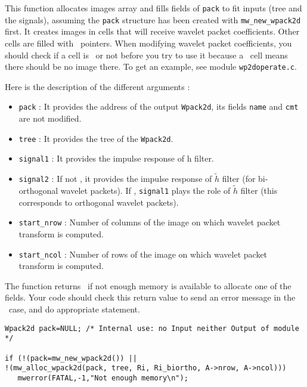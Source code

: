 \Description
This function allocates images array and fills fields of \verb+pack+ to fit inputs 
(tree and the signals), assuming the \verb+pack+ structure has been created with \verb+mw_new_wpack2d+ first. 
It creates images in cells that will receive wavelet packet coefficients. Other cells are filled with \Null\
pointers. When modifying wavelet packet coefficients, you should check if  a
cell is \Null\ or not before you try to use it because a \Null\ cell means there
should be no image there.  To get an example, see module \verb+wp2doperate.c+.


Here is the description of the different arguments :
\begin{itemize}
\item \verb+pack+ : It provides the address of the output
  \verb+Wpack2d+, its fields \verb+name+ and \verb+cmt+ are not modified.
\item \verb+tree+ : It provides the tree of the \verb+Wpack2d+.
\item \verb+signal1+ : It provides the impulse response of h filter.
\item \verb+signal2+ : If not \Null, it provides the impulse response of
  $\tilde{h}$ filter (for bi-orthogonal wavelet packets). If \Null, \verb+signal1+ plays the role of 
  $\tilde{h}$ filter (this corresponds to orthogonal wavelet packets). 
\item \verb+start_nrow+ : Number of columns of the image on which wavelet packet transform is computed.
\item \verb+start_ncol+ : Number of rows of the image on which wavelet packet transform is computed.
\end{itemize}

The function returns \Null\ if not enough memory is available to allocate one of the fields. 
Your code should check this return value to send an error message in the \Null\ case, and do appropriate statement.

\Next
\Example
\begin{verbatim}
Wpack2d pack=NULL; /* Internal use: no Input neither Output of module */

if (!(pack=mw_new_wpack2d()) ||
!(mw_alloc_wpack2d(pack, tree, Ri, Ri_biortho, A->nrow, A->ncol)))
   mwerror(FATAL,-1,"Not enough memory\n");
\end{verbatim}

